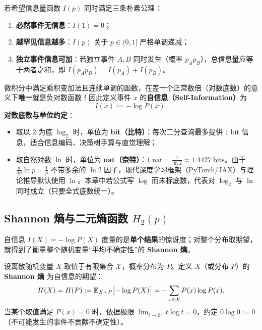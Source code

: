 若希望信息量函数 $I(p)$ 同时满足三条朴素公理：
\begin{enumerate}
  \item \textbf{必然事件无信息}：$I(1) = 0$；
  \item \textbf{越罕见信息越多}：$I(p)$ 关于 $p \in (0, 1]$ 严格单调递减；
  \item \textbf{独立事件信息可加}：若独立事件 $A, B$ 同时发生（概率 $p_A p_B$），总信息量应等于两者之和，即 $I(p_A p_B) = I(p_A) + I(p_B)$。
\end{enumerate}
微积分中满足乘积变加法且连续单调的函数，在差一个正常数倍（对数底数）的意义下\textbf{唯一}就是负对数函数！因此定义事件 $x$ 的\textbf{自信息（Self-Information）}为
\begin{equation}
  I(x) := -\log P(x). \label{eq:ch4-self-info}
\end{equation}
\textbf{对数底数与单位约定}：
\begin{itemize}
  \item 取以 $2$ 为底 $\log_2$ 时，单位为 \textbf{bit（比特）}：每次二分查询最多提供 $1\;\text{bit}$ 信息，适合信息编码、决策树手算与直觉理解；
  \item 取自然对数 $\ln$ 时，单位为 \textbf{nat（奈特）}：$1\;\text{nat} = \frac{1}{\ln 2} \approx 1.4427\;\text{bits}$。由于 $\frac{d}{dp}\ln p = \frac{1}{p}$ 不带多余的 $\ln 2$ 因子，现代深度学习框架（PyTorch/JAX）与理论推导默认使用 $\ln$。本章中若公式写 $\log$ 而未标底数，代表对 $\log_2$ 与 $\ln$ 同时成立（只要全式底数统一）。
\end{itemize}

\subsection{Shannon 熵与二元熵函数 $H_2(p)$}

自信息 $I(X) = -\log P(X)$ 度量的是\textbf{单个结果}的惊讶度；对整个分布取期望，就得到了衡量整个随机变量“平均不确定性”的 \textbf{Shannon 熵}。

\begin{defBox}
\begin{definition}
\label{def:ch4-entropy}
设离散随机变量 $X$ 取值于有限集合 $\mathcal{X}$，概率分布为 $P$。定义 $X$（或分布 $P$）的 \textbf{Shannon 熵} 为自信息的期望：
\begin{equation}
  H(X) = H(P) := \mathbb{E}_{X \sim P}\bigl[-\log P(X)\bigr] = -\sum_{x \in \mathcal{X}} P(x)\log P(x). \label{eq:ch4-entropy}
\end{equation}
当某个取值满足 $P(x) = 0$ 时，依据极限 $\lim_{t \to 0^+} t\log t = 0$，约定 $0\log 0 := 0$（不可能发生的事件不贡献不确定性）。
\end{definition}
\end{defBox}

